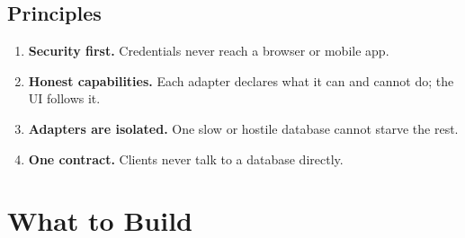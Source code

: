 \documentclass[11pt,a4paper]{article}
\begin{document}
\subsection{Principles}
\begin{enumerate}
  \item \textbf{Security first.} Credentials never reach a browser or mobile app.
  \item \textbf{Honest capabilities.} Each adapter declares what it can and cannot do; the UI follows it.
  \item \textbf{Adapters are isolated.} One slow or hostile database cannot starve the rest.
  \item \textbf{One contract.} Clients never talk to a database directly.
\end{enumerate}

\section{What to Build}
\end{document}

